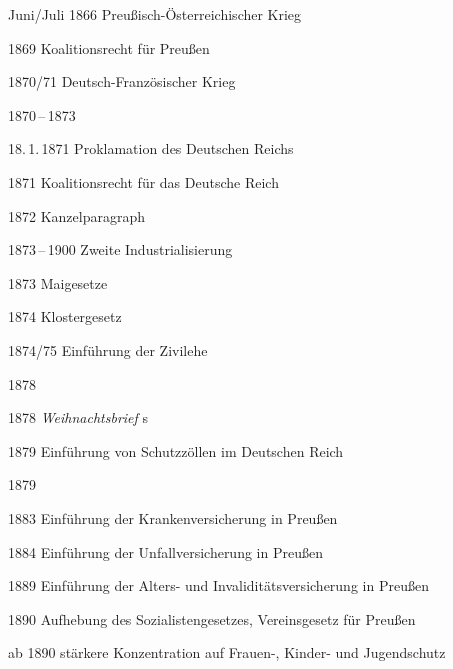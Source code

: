 \begin{chronik}
\item[Juni/Juli 1866]
Preußisch-Österreichischer Krieg

\item[1869]
Koalitionsrecht für Preußen

\item[1870/71]
Deutsch-Französischer Krieg

\item[1870\,--\,1873]

\item[18.\,1.\,1871]
Proklamation des Deutschen Reichs

\item[1871]
Koalitionsrecht für das Deutsche Reich

\item[1872]
Kanzelparagraph

\item[1873\,--\,1900]
Zweite Industrialisierung

\item[1873]
Maigesetze

\item[1874]
Klostergesetz

\item[1874/75]
Einführung der Zivilehe

\item[1878]

\item[1878]
\emph{Weihnachtsbrief} s

\item[1879]
Einführung von Schutzzöllen im Deutschen Reich

\item[1879] 

\item[1883]
Einführung der Krankenversicherung in Preußen

\item[1884]
Einführung der Unfallversicherung in Preußen

\item[1889]
Einführung der Alters- und Invaliditätsversicherung in Preußen

\item[1890]
Aufhebung des Sozialistengesetzes, Vereinsgesetz für Preußen

\item[ab 1890]
stärkere Konzentration auf Frauen-, Kinder- und Jugendschutz


\end{chronik}
